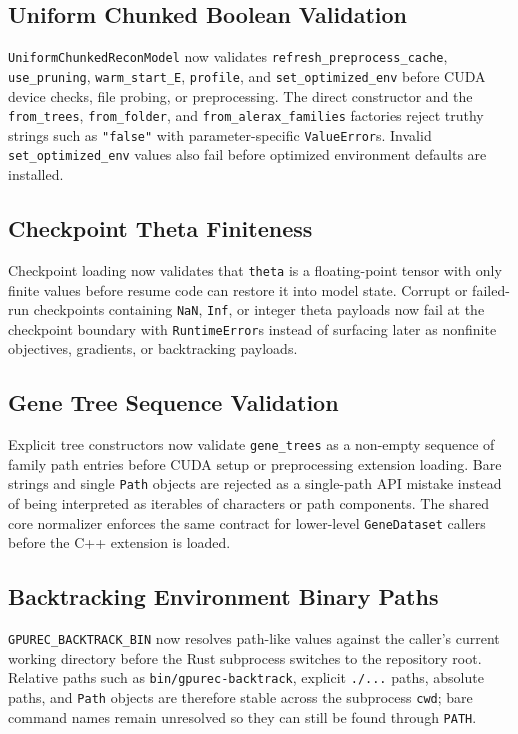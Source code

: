 \documentclass[11pt]{article}
\begin{document}
\subsection{Uniform Chunked Boolean Validation}

\texttt{UniformChunkedReconModel} now validates
\texttt{refresh\_preprocess\_cache}, \texttt{use\_pruning},
\texttt{warm\_start\_E}, \texttt{profile}, and
\texttt{set\_optimized\_env} before CUDA device checks, file probing, or
preprocessing.  The direct constructor and the \texttt{from\_trees},
\texttt{from\_folder}, and \texttt{from\_alerax\_families} factories reject
truthy strings such as \texttt{"false"} with parameter-specific
\texttt{ValueError}s.  Invalid \texttt{set\_optimized\_env} values also fail
before optimized environment defaults are installed.

\subsection{Checkpoint Theta Finiteness}

Checkpoint loading now validates that \texttt{theta} is a floating-point tensor
with only finite values before resume code can restore it into model state.
Corrupt or failed-run checkpoints containing \texttt{NaN}, \texttt{Inf}, or
integer theta payloads now fail at the checkpoint boundary with
\texttt{RuntimeError}s instead of surfacing later as nonfinite objectives,
gradients, or backtracking payloads.

\subsection{Gene Tree Sequence Validation}

Explicit tree constructors now validate \texttt{gene\_trees} as a non-empty
sequence of family path entries before CUDA setup or preprocessing extension
loading.  Bare strings and single \texttt{Path} objects are rejected as a
single-path API mistake instead of being interpreted as iterables of
characters or path components.  The shared core normalizer enforces the same
contract for lower-level \texttt{GeneDataset} callers before the C++ extension
is loaded.

\subsection{Backtracking Environment Binary Paths}

\texttt{GPUREC\_BACKTRACK\_BIN} now resolves path-like values against the
caller's current working directory before the Rust subprocess switches to the
repository root.  Relative paths such as \texttt{bin/gpurec-backtrack},
explicit \texttt{./...} paths, absolute paths, and \texttt{Path} objects are
therefore stable across the subprocess \texttt{cwd}; bare command names remain
unresolved so they can still be found through \texttt{PATH}.
\end{document}
